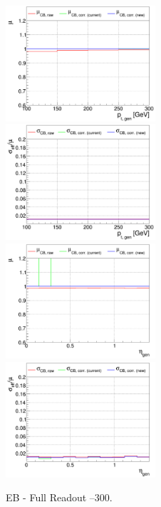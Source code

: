 \begin{figure}
\includegraphics[width=0.495\textwidth]{./plots_pdf/ECAL_plots/plotsNOPU/EB/FULL/pdf/GENPT/EBFULL_GENPT_0100_0300_MuOverBins.pdf}
\includegraphics[width=0.495\textwidth]{./plots_pdf/ECAL_plots/plotsNOPU/EB/FULL/pdf/GENPT/EBFULL_GENPT_0100_0300_EffSigmaOverBins.pdf}
\includegraphics[width=0.495\textwidth]{./plots_pdf/ECAL_plots/plotsNOPU/EB/FULL/pdf/GENETA/EBFULL_GENETA_0100_0300_MuOverBins.pdf}
\includegraphics[width=0.495\textwidth]{./plots_pdf/ECAL_plots/plotsNOPU/EB/FULL/pdf/GENETA/EBFULL_GENETA_0100_0300_EffSigmaOverBins.pdf}
\caption{EB - Full Readout --300\GeV.}
\end{figure}



